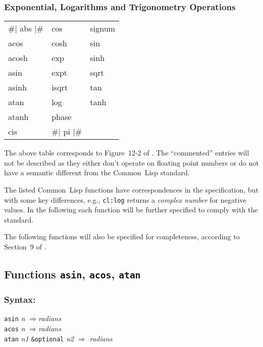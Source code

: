\documentclass[10pt,fleqn]{article}
\newcommand{\CL}{\textsf{Common~Lisp}}
\newcommand{\code}[1]{\texttt{#1}}
\newcommand{\varname}[1]{\textit{#1}}
\newcommand{\clterm}[1]{\textit{#1}}
\newcommand{\RArrow}{$\Rightarrow$}
\newcommand{\DDictionaryItem}[1]{\vspace*{6pt}\noindent\hrulefill\vspace*{-9pt}\subsection*{#1}}
\newcommand{\DSyntax}{\subsubsection*{Syntax:}}
\begin{document}
\subsubsection{Exponential, Logarithms and Trigonometry Operations}
\label{sect:transc-ops}

\begin{tt}
  \begin{tabular}{lll}
    \#| abs |\# & cos & signum\\
    acos &  cosh &  sin\\
    acosh & exp  &  sinh\\
    asin &  expt &  sqrt\\
    asinh & isqrt &  tan\\
    atan &  log &   tanh\\
    atanh & phase & \\
    cis & \#| pi |\# & \\
  \end{tabular}
\end{tt}

\vspace*{3mm}

\noindent
The above table corresponds to Figure~12-2 of \cite{1996:ANSIHyperSpec}.
The ``commented'' entries will not be described as they either don't
operate on floating point numbers or do not have a semantic different
from the \CL{} standard.

\noindent
The listed \CL{} functions have correspondences in the \cite{2008:IEEE-754}
specification, but with some key differences, e.g., \code{cl:log} returns
a \clterm{complex number} for negative values.  In the following each
function will be further specified to comply with the \cite{2008:IEEE-754}
standard.

\vspace*{3mm}

The following functions will also be specified for completeness,
according to Section~9 of \cite{2008:IEEE-754}.


\DDictionaryItem{Functions \code{asin}, \code{acos}, \code{atan}}
\index{A!\code{asin}}
\index{A!\code{acos}}
\index{A!\code{atan}}

\DSyntax{}

\code{asin} \varname{n} \RArrow \varname{radians}\\
\code{acos} \varname{n} \RArrow \varname{radians}\\
\code{atan} \varname{n1} \code{\&optional} \varname{n2} \RArrow
\varname{radians}
\end{document}
